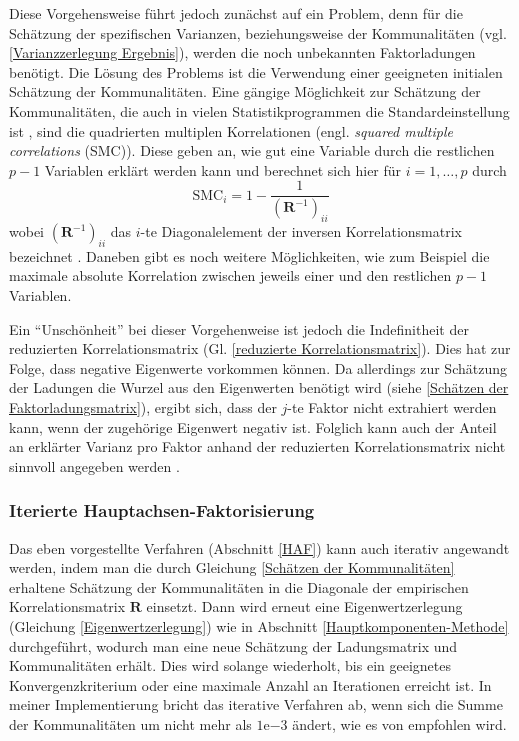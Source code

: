 \documentclass[11pt]{scrartcl}
\begin{document}
	Diese Vorgehensweise führt jedoch zunächst auf ein Problem, denn für die
	Schätzung der spezifischen Varianzen, beziehungsweise der Kommunalitäten
	(vgl. \ref{Varianzzerlegung Ergebnis}), werden die noch unbekannten Faktorladungen benötigt. Die
	Lösung des Problems ist die Verwendung einer geeigneten initialen Schätzung der
	Kommunalitäten. Eine gängige
	Möglichkeit zur Schätzung der Kommunalitäten, die auch in vielen
	Statistikprogrammen die Standardeinstellung ist \parencite[9]{Grieder.2021}, sind
	die quadrierten multiplen Korrelationen (engl. \textit{squared multiple
	correlations} (SMC)). Diese geben an, wie gut eine Variable durch die restlichen
	$p - 1$ Variablen erklärt werden kann und berechnet sich hier für $i = 1, \dotsc, p$
	durch
	\begin{equation}
		\text{SMC}_i = 1 - \frac{1}{ \left( \mathbf{R}^{-1} \right)_{ii} }
	\end{equation}
	wobei $\left( \mathbf{R}^{-1} \right)_{ii}$ das $i$-te Diagonalelement der
	inversen Korrelationsmatrix bezeichnet \parencite[422]{Rencher.2002}.
	Daneben gibt es noch weitere Möglichkeiten, wie zum Beispiel die maximale
	absolute Korrelation zwischen jeweils einer und den restlichen $p - 1$
	Variablen. 
	
	Ein \enquote{Unschönheit} bei dieser Vorgehenweise ist jedoch die Indefinitheit der
	reduzierten Korrelationsmatrix (Gl. \ref{reduzierte Korrelationsmatrix}).
	Dies hat zur Folge, dass negative Eigenwerte
	vorkommen können. Da allerdings zur Schätzung der Ladungen die Wurzel aus den
	Eigenwerten benötigt wird (siehe \ref{Schätzen der Faktorladungsmatrix}), ergibt
	sich, dass der $j$-te Faktor nicht extrahiert werden kann, wenn der zugehörige
	Eigenwert negativ ist. Folglich kann auch der Anteil an erklärter Varianz pro Faktor
	anhand der reduzierten Korrelationsmatrix nicht sinnvoll angegeben werden \parencite[6 - 8]{LorenzoSeva.2013}. 
	
	\subsubsection{Iterierte Hauptachsen-Faktorisierung}
	\label{Iterierte HAF}
	Das eben vorgestellte Verfahren  (Abschnitt \ref{HAF}) kann auch iterativ angewandt werden, indem
	man die durch Gleichung \ref{Schätzen der Kommunalitäten} erhaltene Schätzung der Kommunalitäten
	in die Diagonale der empirischen Korrelationsmatrix $\mathbf{R}$ einsetzt. Dann
	wird erneut eine Eigenwertzerlegung (Gleichung \ref{Eigenwertzerlegung}) wie in Abschnitt \ref{Hauptkomponenten-Methode}
	durchgeführt, wodurch man eine neue Schätzung der Ladungsmatrix und Kommunalitäten erhält. Dies wird
	solange wiederholt, bis ein geeignetes Konvergenzkriterium oder eine maximale
	Anzahl an Iterationen erreicht ist. In meiner Implementierung bricht das iterative Verfahren
	ab, wenn sich die Summe der Kommunalitäten um nicht mehr als $1\mathrm{e}{-3}$ ändert, wie es von
	\cite[30]{Grieder.2021} empfohlen wird.
		
\end{document}
